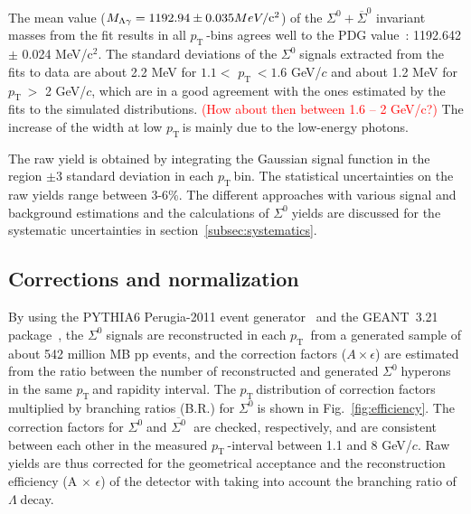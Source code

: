 \documentclass[ALICE,manyauthors]{cernphprep}
\newcommand{\sig}{\ensuremath{\Sigma^0  \; }}
\newcommand{\asig}{\ensuremath{\overline{\Sigma^0} \; }}
\newcommand{\lam}{\ensuremath{\Lambda \; }}
\newcommand{\pt}{\ensuremath{p_{\mathrm{T}\; }}}
\newcommand{\red}{\textcolor{red}}
\begin{document}
The mean value ($M_{\Lambda \gamma} = 1192.94 \pm 0.035 MeV/\rm{c}^2$) of the 
$\Sigma^0+ \overline{\Sigma}^{0}$ invariant masses from the fit results in all \pt-bins agrees
well to the PDG value~\cite{cite:PDG}: 1192.642 $\pm$ 0.024 MeV/c$^2$.
The standard deviations of the \sig signals extracted from the fits to data are about 2.2 MeV for 
$1.1 <$ \pt $< 1.6$ GeV/$c$ and about 1.2 MeV for \pt$>$ 2 GeV/$c$, which are in a good agreement 
with the ones estimated by the fits to the simulated distributions. \red{(How about then between 1.6 -- 2 GeV/c?)}
The increase of the width at low \pt is mainly due to the low-energy photons.

The raw yield is obtained by integrating the Gaussian signal function in the region $\pm 3$ standard deviation 
in each  \pt  bin. The statistical uncertainties on the raw yields range between 3-6\%.
The different approaches with various signal and background estimations and 
the calculations of \sig yields are discussed for the systematic uncertainties in section~\ref{subsec:systematics}.

 \subsection{Corrections and normalization}

By using the PYTHIA6 Perugia-2011 event generator~\cite{cite:pythia6}
and the GEANT~3.21 package~\cite{cite:GEANT}, the \sig signals are reconstructed in each \pt
from a generated sample of about 542 million MB pp events, and the correction factors ($A\times\epsilon$) are 
estimated from the ratio between the number of reconstructed and generated \sig hyperons 
in the same \pt and rapidity interval. The \pt distribution of correction factors multiplied by branching 
ratios (B.R.) for \sig is shown in Fig.~\ref{fig:efficiency}. The correction factors for \sig and \asig 
are checked, respectively, and are consistent between each other in the measured \pt-interval between 
1.1 and 8 GeV/$c$. Raw yields are thus corrected for the geometrical acceptance and the reconstruction efficiency
(A $\times$ $\epsilon$) of the detector with taking into account the branching ratio of \lam decay.
\end{document}
